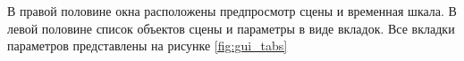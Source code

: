 В правой половине окна расположены предпросмотр сцены и временная шкала. В левой половине список объектов сцены и параметры в виде вкладок. Все вкладки параметров представлены на рисунке \ref{fig:gui_tabs}

\begin{figure}[h]
    \centering
    \begin{minipage}[h]{0.32\linewidth}
    \end{minipage}
    \hfill\begin{minipage}[h]{0.32\linewidth}
        \center{
}
\end{minipage}
\end{figure}
